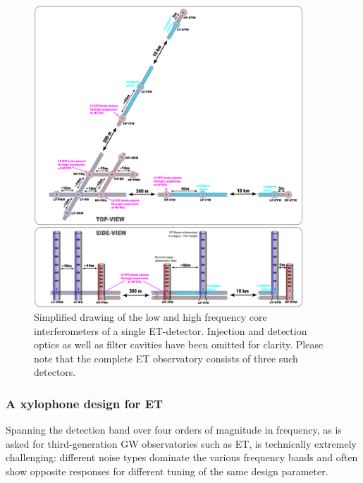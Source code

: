 \begin{figure}[p]
\centering
\includegraphics[width=0.9\textwidth]{Detector/Optics/OpticalLayout/OpticalLayoutFigures/ET_April2011_v2.png}
\caption{ Simplified drawing of the low and high frequency core interferometers of a single ET-detector. Injection and detection optics as well as filter cavities have been omitted for clarity. Please note that the complete ET observatory consists of three such detectors.%
}
\label{Fig:Simple_ETv1}
\end{figure}

\subsubsection{A xylophone design for ET}\label{sec:xylophone} 
Spanning the detection band over four orders of magnitude in frequency, as is
asked for third-generation GW observatories such as ET, is technically extremely
challenging: different noise types dominate the various frequency bands and
often show opposite responses for different tuning of the same design parameter.

